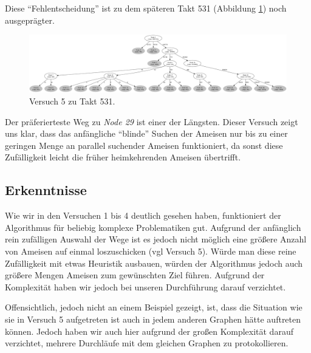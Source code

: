Diese "`Fehlentscheidung"' ist zu dem späteren Takt 531 (Abbildung \ref{fig:v5_531}) noch ausgeprägter.

\begin{figure}[htbp]
	\includegraphics[width=\textwidth]{images/v5_531.png}
	\caption{Versuch 5 zu Takt 531.}
	\label{fig:v5_531}
\end{figure}

Der präferierteste Weg zu \emph{Node 29} ist einer der Längsten. 
Dieser Versuch zeigt uns klar, dass das anfängliche "`blinde"' Suchen der Ameisen  nur bis zu einer geringen Menge an parallel suchender Ameisen funktioniert, da sonst diese Zufälligkeit leicht die früher heimkehrenden Ameisen übertrifft.

\subsection{Erkenntnisse}
\label{sec:erkent}
Wie wir in den Versuchen 1 bis 4 deutlich gesehen haben, funktioniert der Algorithmus für beliebig komplexe Problematiken gut.
Aufgrund der anfänglich rein zufälligen Auswahl der Wege ist es jedoch nicht möglich eine größere Anzahl von Ameisen auf einmal loszuschicken (vgl Versuch 5).
Würde man diese reine Zufälligkeit mit etwas Heuristik ausbauen, würden der Algorithmus jedoch auch größere Mengen Ameisen zum gewünschten Ziel führen.
Aufgrund der Komplexität haben wir jedoch bei unseren Durchführung darauf verzichtet.\par 
Offensichtlich, jedoch nicht an einem Beispiel gezeigt, ist, dass die Situation wie sie in Versuch 5 aufgetreten ist auch in jedem anderen Graphen hätte auftreten können. Jedoch haben wir auch hier aufgrund der großen Komplexität darauf verzichtet, mehrere Durchläufe mit dem gleichen Graphen zu protokollieren.

